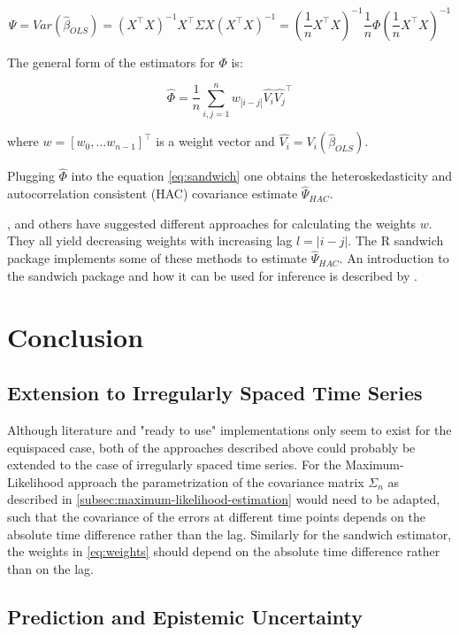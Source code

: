 \begin{equation}\label{eq:sandwich}
\Psi = Var(\hat \beta_{OLS}) = (X^{\top} X)^{-1} X^{\top} \Sigma X (X^{\top}X)^{-1} =
(\frac{1}{n} X^{\top} X)^{-1} \frac{1}{n} \Phi (\frac{1}{n} X^{\top} X)^{-1}
\end{equation}

The general form of the estimators for $\Phi$ is:

\begin{equation}\label{eq:weights}
\hat{\Phi} = \frac{1}{n} \sum_{i,j=1}^{n} w_{|i-j|}\hat{V_i}\hat{V_j}^{\top}
\end{equation}

where $w=[w_0, \dots w_{n-1}]^{\top}$ is a weight vector and $\hat{V_i} = V_i(\hat{\beta}_{OLS})$.

Plugging $\hat{\Phi}$ into the equation \ref{eq:sandwich} one obtains the
heteroskedasticity and autocorrelation consistent (HAC) covariance estimate $\hat{\Psi}_{HAC}$.

\citeauthor{newey_automatic_1994}, \citeauthor{andrews_heteroskedasticity_1991} and others have suggested different approaches
for calculating the weights $w$. They all yield decreasing weights with increasing lag $l=|i-j|$.
The R sandwich package implements some of these methods to estimate $\hat{\Psi}_{HAC}$.
An introduction to the sandwich package and how it can be used
for inference is described by \citeauthor{zeileis_econometric_2004}.


\section{Conclusion}

\subsection{Extension to Irregularly Spaced Time Series}

Although literature and "ready to use" implementations only seem to exist for the equispaced case,
both of the approaches described above could probably be extended to the case of irregularly spaced time series.
For the Maximum-Likelihood approach the parametrization of the covariance matrix $\Sigma_n$ as described in
\ref{subsec:maximum-likelihood-estimation} would need to be adapted,
such that the covariance of the errors at different time points depends on the absolute time difference rather than the lag.
Similarly for the sandwich estimator, the weights in \ref{eq:weights} should depend on the absolute time difference rather than on the lag.


\subsection{Prediction and Epistemic Uncertainty}






